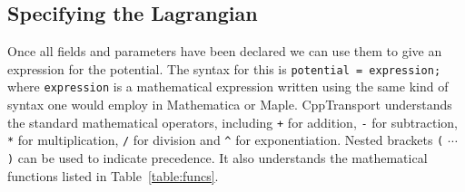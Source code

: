 \documentclass[11pt,a4paper]{article}
\newcommand{\packagefont}{\sffamily}
\newcommand{\CppTransport}{{\packagefont CppTransport}}
\newcommand{\Mathematica}{{\packagefont Mathematica}}
\newcommand{\Maple}{{\packagefont Maple}}
\newcommand{\attribute}[1]{\texttt{#1}}
\newcommand{\descfile}[1]{\texttt{#1}}
\begin{document}
\subsection{Specifying the Lagrangian}
\label{sec:lagrangian-block}
Once all fields and parameters have been declared
we can use them to give an expression for the potential.
The syntax for this is
\attribute{potential = expression;}
where \attribute{expression} is a mathematical
expression written using the same kind of syntax
one would employ in
{\Mathematica} or {\Maple}.
{\CppTransport} understands the standard mathematical
operators, including
\descfile{+} for addition,
\descfile{-} for subtraction,
\descfile{*} for multiplication,
\descfile{/} for division
and
\descfile{^} for exponentiation.
Nested brackets
\descfile{(} $\cdots$ \descfile{)}
can be used to indicate precedence.
It also understands the mathematical functions listed in
Table~\ref{table:funcs}.
\end{document}

